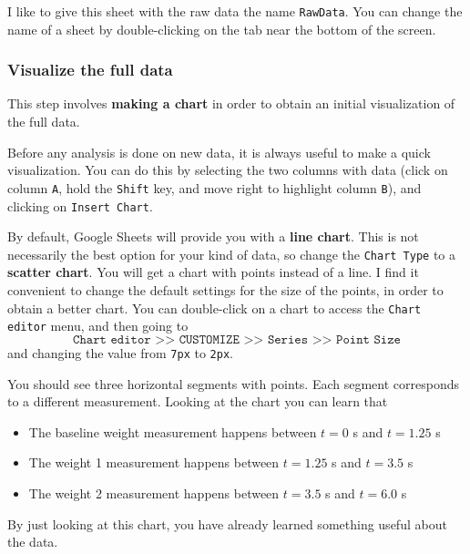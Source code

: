 I like to give this sheet with the raw data the name \texttt{RawData}. You can change the name of a sheet by double-clicking on the tab near the bottom of the screen.
%
\subsubsection{Visualize the full data}
%
This step involves \textbf{making a chart} in order to obtain an initial visualization of the full data.

Before any analysis is done on new data, it is always useful to make a quick visualization. You can do this by selecting the two columns with data (click on column \texttt{A}, hold the \texttt{Shift} key, and move right to highlight column \texttt{B}), and clicking on \texttt{Insert Chart}.

By default, Google Sheets will provide you with a \textbf{line chart}. This is not necessarily the best option for your kind of data, so change the \texttt{Chart Type} to a \textbf{scatter chart}. You will get a chart with points instead of a line. I find it convenient to change the default settings for the size of the points, in order to obtain a better chart. You can double-click on a chart to access the \texttt{Chart editor} menu, and then going to
\begin{equation}
    \texttt{Chart editor >> CUSTOMIZE >> Series >> Point Size}
\end{equation}
and changing the value from \texttt{7px} to \texttt{2px}.

You should see three horizontal segments with points. Each segment corresponds to a different measurement. Looking at the chart you can learn that
\begin{itemize}
    \item The baseline weight measurement happens between $t = 0$ s and $t = 1.25$ s
    \item The weight 1 measurement happens between $t = 1.25$ s and $t = 3.5$ s
    \item The weight 2 measurement happens between $t = 3.5$ s and $t = 6.0$ s
\end{itemize}
By just looking at this chart, you have already learned something useful about the data.
%
\begin{center}
\end{center}
%
